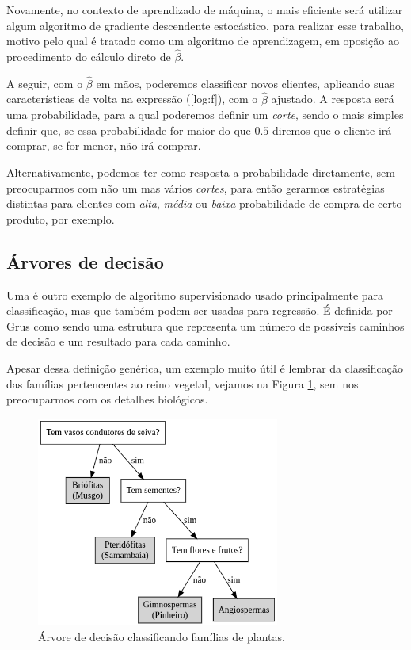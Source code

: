 Novamente, no contexto de aprendizado de máquina, o mais eficiente será utilizar algum algoritmo de gradiente descendente estocástico, para realizar esse trabalho, motivo pelo qual é tratado como um algoritmo de aprendizagem, em oposição ao procedimento do cálculo direto de $\hat{\beta}$.

A seguir, com o $\hat{\beta}$ em mãos, poderemos classificar novos clientes, aplicando suas características de volta na expressão (\ref{log:f}), com o $\hat{\beta}$ ajustado. A resposta será uma probabilidade, para a qual poderemos definir um \emph{corte}, sendo o mais simples definir que, se essa probabilidade for maior do que $0.5$ diremos que o cliente irá comprar, se for menor, não irá comprar.

Alternativamente, podemos ter como resposta a probabilidade diretamente, sem preocuparmos com não um mas vários \emph{cortes}, para então gerarmos estratégias distintas para clientes com \emph{alta}, \emph{média} ou \emph{baixa} probabilidade de compra de certo produto, por exemplo.

\subsection{Árvores de decisão}

Uma  é outro exemplo de algoritmo supervisionado usado principalmente para classificação, mas que também podem ser usadas para regressão. É definida por Grus \citep{data} como sendo uma estrutura que representa um número de possíveis caminhos de decisão e um resultado para cada caminho.

Apesar dessa definição genérica, um exemplo muito útil é lembrar da classificação das famílias pertencentes ao reino vegetal, vejamos na Figura \ref{fig:plantas}, sem nos preocuparmos com os detalhes biológicos.

\begin{figure}[htb]
\centering
\includegraphics[width=8cm]{figuras/plantas}
\caption{Árvore de decisão classificando famílias de plantas.}
\label{fig:plantas}
\end{figure}

